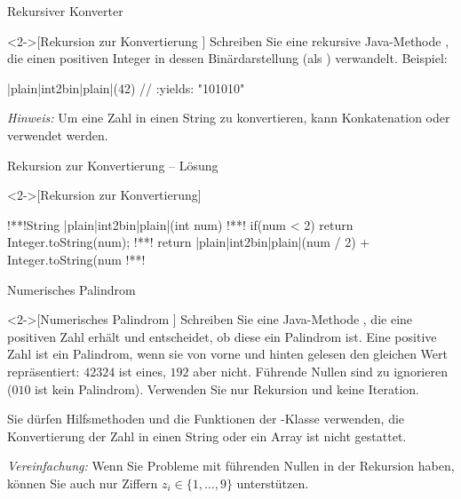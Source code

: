 \begin{frame}[fragile,c]{Rekursiver Konverter}
    \begin{exercise}<2->[Rekursion zur Konvertierung ]
        \pause{}Schreiben Sie eine rekursive Java-Methode , die einen positiven Integer in dessen Binärdarstellung (als ) verwandelt. Beispiel:\pause{}
\begin{plainjava}
|plain|int2bin|plain|(42) // :yields: "101010"
\end{plainjava}
    \pause{}\textit{Hinweis:} Um eine Zahl in einen String zu konvertieren, kann Konkatenation oder  verwendet werden.
    \end{exercise}
\end{frame}

\begin{frame}[fragile,c]{Rekursion zur Konvertierung -- Lösung}
    \begin{solve}<2->[Rekursion zur Konvertierung]
\begin{plainjava}
!**!String |plain|int2bin|plain|(int num){
!**!    if(num < 2) return Integer.toString(num);
!**!    return |plain|int2bin|plain|(num / 2) + Integer.toString(num %
!**!}
\end{plainjava}
    \end{solve}
\end{frame}

\begin{frame}[fragile,c]{Numerisches Palindrom}
    \begin{exercise}<2->[Numerisches Palindrom ]
        \pause{}Schreiben Sie eine Java-Methode , die eine positiven Zahl  erhält und entscheidet, ob diese ein Palindrom ist.\pause{}
        Eine positive Zahl ist ein Palindrom, wenn sie von vorne und hinten gelesen den gleichen Wert repräsentiert: \(42324\) ist eines, \(192\) aber nicht.
        Führende Nullen sind zu ignorieren (\(010\) ist kein Palindrom). Verwenden Sie nur Rekursion und keine Iteration.\medskip

        Sie dürfen Hilfsmethoden und die Funktionen der -Klasse verwenden, die Konvertierung der Zahl in einen String oder ein Array ist nicht gestattet.\medskip

        \textit{Vereinfachung:} Wenn Sie Probleme mit führenden Nullen in der Rekursion haben, können Sie auch nur Ziffern \(z_i \in \{1, \ldots, 9\}\) unterstützen.
    \end{exercise}
\end{frame}

